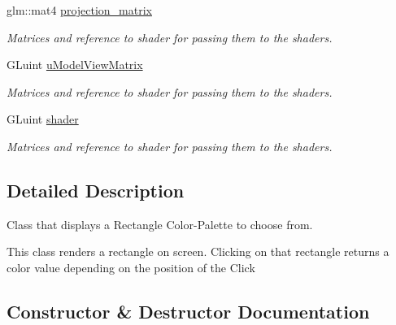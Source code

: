 {\bf }\par
\begin{DoxyCompactItemize}
\item 
glm\+::mat4 \hyperlink{classcft_1_1Palette_a36b93828ab0f3cc6de2b472055d30852}{projection\+\_\+matrix}\hypertarget{classcft_1_1Palette_a36b93828ab0f3cc6de2b472055d30852}{}\label{classcft_1_1Palette_a36b93828ab0f3cc6de2b472055d30852}

\begin{DoxyCompactList}\small\item\em Matrices and reference to shader for passing them to the shaders. \end{DoxyCompactList}\item 
G\+Luint \hyperlink{classcft_1_1Palette_ac9e04f2c291ab32581a11a34b9d33d1a}{u\+Model\+View\+Matrix}\hypertarget{classcft_1_1Palette_ac9e04f2c291ab32581a11a34b9d33d1a}{}\label{classcft_1_1Palette_ac9e04f2c291ab32581a11a34b9d33d1a}

\begin{DoxyCompactList}\small\item\em Matrices and reference to shader for passing them to the shaders. \end{DoxyCompactList}\item 
G\+Luint \hyperlink{classcft_1_1Palette_a0ae16c4a19279907de42709e31c08c9b}{shader}\hypertarget{classcft_1_1Palette_a0ae16c4a19279907de42709e31c08c9b}{}\label{classcft_1_1Palette_a0ae16c4a19279907de42709e31c08c9b}

\begin{DoxyCompactList}\small\item\em Matrices and reference to shader for passing them to the shaders. \end{DoxyCompactList}\end{DoxyCompactItemize}



\subsection{Detailed Description}
Class that displays a Rectangle Color-\/\+Palette to choose from. 

This class renders a rectangle on screen. Clicking on that rectangle returns a color value depending on the position of the Click 

\subsection{Constructor \& Destructor Documentation}
